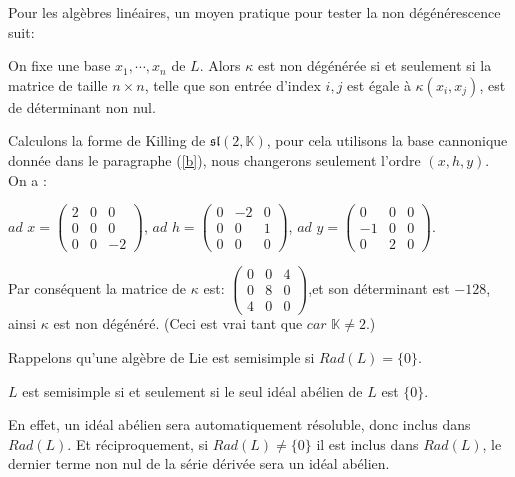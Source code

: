 \documentclass[a4paper,openany,12pt]{report}
\newcommand{\KK}{\mathbb{K}}
\newcommand{\ssl}{\mathfrak{sl}}
\theoremstyle{break}
{\theorembodyfont{\upshape}
\newtheorem*{rmq}{Remarque :}
\newtheorem*{prv}{Preuve :}
\newtheorem*{ex}{Exemples :}
\newtheorem*{exe}{Exemple : }
\newtheorem*{nota}{Notation :}
\newtheorem*{dem}{D\'emonstration :}}
\begin{document}
Pour les algèbres linéaires, un moyen pratique pour tester la non dégénérescence suit: 

On fixe une base $x_1, \cdots, x_n$ de $L$. Alors $\kappa$ est non dégénérée si et seulement si la matrice de taille $n \times n$, telle que son entrée d'index $i,j$ est égale à $\kappa(x_i,x_j)$, est de déterminant non nul. 

\begin{exe}
\quad Calculons la forme de Killing de $\ssl(2,\KK)$, pour cela utilisons la base cannonique donnée dans le paragraphe (\ref{b}), nous changerons seulement l'ordre $(x,h,y)$. On a :
\begin{center}
$ad$ $x = \begin{pmatrix} 2 & 0 & 0 \\ 0 & 0 & 0 \\ 0 & 0 & -2 \end{pmatrix}$,
$ad$ $h = \begin{pmatrix} 0 & -2 & 0 \\ 0 & 0 & 1 \\ 0 & 0 & 0 \end{pmatrix}$,
$ad$ $y = \begin{pmatrix} 0 & 0 & 0 \\ -1 & 0 & 0 \\ 0 & 2 & 0 \end{pmatrix}$.
\end{center} 

Par conséquent la matrice de $\kappa$ est: 
$\begin{pmatrix} 
0 & 0 & 4 \\
0 & 8 & 0 \\
4 & 0 & 0
\end{pmatrix}$,et son déterminant est $-128$, ainsi $\kappa$ est non dégénéré. (Ceci est vrai tant que $car$ $\KK \neq 2$.)
\end{exe}

Rappelons qu'une algèbre de Lie est semisimple si $Rad(L)= \{0\}$. 

\begin{prop}
\quad $L$ est semisimple si et seulement si le seul idéal abélien de $L$ est $\{0\}$.
\end{prop}

\begin{prv}
\quad En effet, un idéal abélien sera automatiquement résoluble, donc inclus dans $Rad(L)$. Et réciproquement, si $Rad(L) \neq \{0\}$ il est inclus dans $Rad(L)$, le dernier terme non nul de la série dérivée sera un idéal abélien.
\end{prv}
\end{document}
